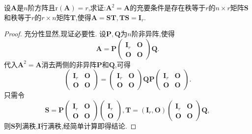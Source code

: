 \documentclass[../../main.tex]{subfiles}%
\begin{document}
\begin{proposition}[幂等矩阵关于满秩分解的刻画]\label{proposition:幂等矩阵关于满秩分解的刻画}
设\(\boldsymbol{A}\)是\(n\)阶方阵且\(\mathrm{r}(\boldsymbol{A}) = r\),求证:\(\boldsymbol{A}^2=\boldsymbol{A}\)的充要条件是存在秩等于\(r\)的\(n\times r\)矩阵\(\boldsymbol{S}\)和秩等于\(r\)的\(r\times n\)矩阵\(\boldsymbol{T}\),使得\(\boldsymbol{A}=\boldsymbol{S}\boldsymbol{T},\boldsymbol{T}\boldsymbol{S}=\boldsymbol{I}_r\).
\end{proposition}
\begin{proof}
充分性显然,现证必要性. 设\(\boldsymbol{P},\boldsymbol{Q}\)为\(n\)阶非异阵,使得
\[
\boldsymbol{A}=\boldsymbol{P}\begin{pmatrix}
\boldsymbol{I}_r&\boldsymbol{O}\\
\boldsymbol{O}&\boldsymbol{O}
\end{pmatrix}\boldsymbol{Q}.
\]
代入\(\boldsymbol{A}^2=\boldsymbol{A}\)消去两侧的非异阵\(\boldsymbol{P}\)和\(\boldsymbol{Q}\),可得
\[
\begin{pmatrix}
\boldsymbol{I}_r&\boldsymbol{O}\\
\boldsymbol{O}&\boldsymbol{O}
\end{pmatrix}=\begin{pmatrix}
\boldsymbol{I}_r&\boldsymbol{O}\\
\boldsymbol{O}&\boldsymbol{O}
\end{pmatrix}\boldsymbol{Q}\boldsymbol{P}\begin{pmatrix}
\boldsymbol{I}_r&\boldsymbol{O}\\
\boldsymbol{O}&\boldsymbol{O}
\end{pmatrix}.
\]
只需令
\[
\boldsymbol{S}=\boldsymbol{P}\begin{pmatrix}
\boldsymbol{I}_r&\boldsymbol{O}\\
\boldsymbol{O}&\boldsymbol{O}
\end{pmatrix}\begin{pmatrix}
\boldsymbol{I}_r\\
\boldsymbol{O}
\end{pmatrix},\boldsymbol{T}=(\boldsymbol{I}_r,\boldsymbol{O})\begin{pmatrix}
\boldsymbol{I}_r&\boldsymbol{O}\\
\boldsymbol{O}&\boldsymbol{O}
\end{pmatrix}\boldsymbol{Q},
\]
则$\boldsymbol{S}$列满秩,$\boldsymbol{I}$行满秩,经简单计算即得结论.
\end{proof}
\end{document}
